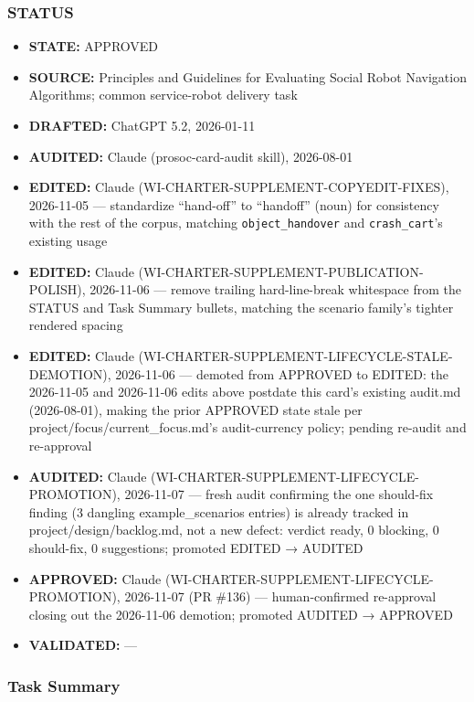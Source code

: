 \documentclass[utf8]{frontiers_suppmat} %
\providecommand{\tightlist}{%
  \setlength{\itemsep}{0pt}\setlength{\parskip}{0pt}}
\begin{document}
\subsubsection{STATUS}\label{status}

\begin{itemize}
\tightlist
\item
  \textbf{STATE:} APPROVED
\item
  \textbf{SOURCE:} Principles and Guidelines for Evaluating Social Robot
  Navigation Algorithms; common service-robot delivery task
\item
  \textbf{DRAFTED:} ChatGPT 5.2, 2026-01-11
\item
  \textbf{AUDITED:} Claude (prosoc-card-audit skill), 2026-08-01
\item
  \textbf{EDITED:} Claude (WI-CHARTER-SUPPLEMENT-COPYEDIT-FIXES),
  2026-11-05 --- standardize ``hand-off'' to ``handoff'' (noun) for
  consistency with the rest of the corpus, matching
  \texttt{object\_handover} and
  \texttt{crash\_cart}'s existing usage
\item
  \textbf{EDITED:} Claude (WI-CHARTER-SUPPLEMENT-PUBLICATION-POLISH),
  2026-11-06 --- remove trailing hard-line-break whitespace from the
  STATUS and Task Summary bullets, matching the scenario family's
  tighter rendered spacing
\item
  \textbf{EDITED:} Claude
  (WI-CHARTER-SUPPLEMENT-LIFECYCLE-STALE-DEMOTION), 2026-11-06 ---
  demoted from APPROVED to EDITED: the 2026-11-05 and 2026-11-06 edits
  above postdate this card's existing audit.md (2026-08-01), making the
  prior APPROVED state stale per project/focus/current\_focus.md's
  audit-currency policy; pending re-audit and re-approval
\item
  \textbf{AUDITED:} Claude (WI-CHARTER-SUPPLEMENT-LIFECYCLE-PROMOTION),
  2026-11-07 --- fresh audit confirming the one should-fix finding (3
  dangling example\_scenarios entries) is already tracked in
  project/design/backlog.md, not a new defect: verdict ready, 0
  blocking, 0 should-fix, 0 suggestions; promoted EDITED → AUDITED
\item
  \textbf{APPROVED:} Claude (WI-CHARTER-SUPPLEMENT-LIFECYCLE-PROMOTION),
  2026-11-07 (PR \#136) --- human-confirmed re-approval closing out the
  2026-11-06 demotion; promoted AUDITED → APPROVED
\item
  \textbf{VALIDATED:} ---
\end{itemize}

\subsubsection{Task Summary}\label{task-summary}
\end{document}
